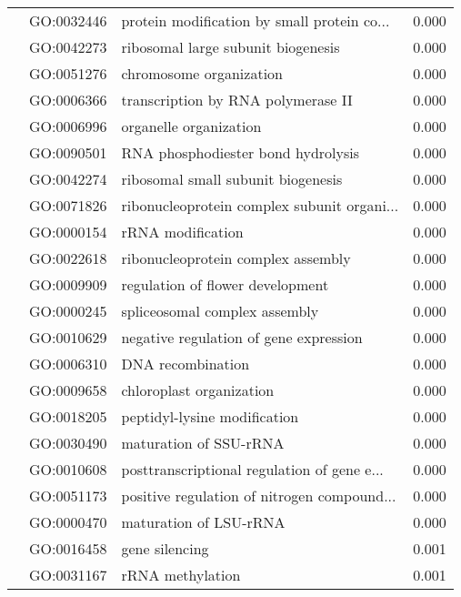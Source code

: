 \begin{longtable}{lllr}
   & GO:0032446 &  protein modification by small protein co... &         0.000 \\
   & GO:0042273 &           ribosomal large subunit biogenesis &         0.000 \\
   & GO:0051276 &                      chromosome organization &         0.000 \\
   & GO:0006366 &           transcription by RNA polymerase II &         0.000 \\
   & GO:0006996 &                       organelle organization &         0.000 \\
   & GO:0090501 &           RNA phosphodiester bond hydrolysis &         0.000 \\
   & GO:0042274 &           ribosomal small subunit biogenesis &         0.000 \\
   & GO:0071826 &  ribonucleoprotein complex subunit organi... &         0.000 \\
   & GO:0000154 &                            rRNA modification &         0.000 \\
   & GO:0022618 &           ribonucleoprotein complex assembly &         0.000 \\
   & GO:0009909 &             regulation of flower development &         0.000 \\
   & GO:0000245 &                spliceosomal complex assembly &         0.000 \\
   & GO:0010629 &       negative regulation of gene expression &         0.000 \\
   & GO:0006310 &                            DNA recombination &         0.000 \\
   & GO:0009658 &                     chloroplast organization &         0.000 \\
   & GO:0018205 &                 peptidyl-lysine modification &         0.000 \\
   & GO:0030490 &                       maturation of SSU-rRNA &         0.000 \\
   & GO:0010608 &  posttranscriptional regulation of gene e... &         0.000 \\
   & GO:0051173 &  positive regulation of nitrogen compound... &         0.000 \\
   & GO:0000470 &                       maturation of LSU-rRNA &         0.000 \\
   & GO:0016458 &                               gene silencing &         0.001 \\
   & GO:0031167 &                             rRNA methylation &         0.001 \\

\end{longtable}
